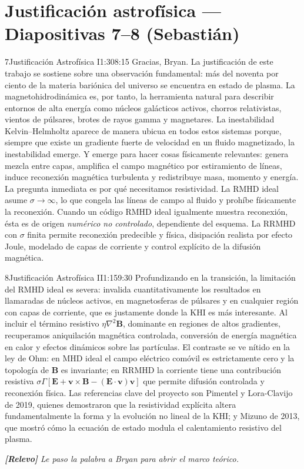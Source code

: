 \documentclass[11pt,a4paper]{article}
\newcommand{\relevo}[1]{%
  \par\medskip
  \noindent\colorbox{tagbg}{\parbox{\dimexpr\linewidth-2\fboxsep\relax}{%
    \small\itshape \textbf{[Relevo]} #1}}\par\medskip}
\begin{document}
\section{Justificación astrofísica --- Diapositivas 7--8 (Sebastián)}

\begin{seborador}{7}{Justificación Astrofísica I}{1:30}{8:15}
Gracias, Bryan. La justificación de este trabajo se sostiene sobre una
observación fundamental: más del noventa por ciento de la materia bariónica
del universo se encuentra en estado de plasma. La magnetohidrodinámica es,
por tanto, la herramienta natural para describir entornos de alta energía
como núcleos galácticos activos, chorros relativistas, vientos de púlsares,
brotes de rayos gamma y magnetares. La inestabilidad Kelvin--Helmholtz
aparece de manera ubicua en todos estos sistemas porque, siempre que existe
un gradiente fuerte de velocidad en un fluido magnetizado, la inestabilidad
emerge. Y emerge para hacer cosas físicamente relevantes: genera mezcla entre
capas, amplifica el campo magnético por estiramiento de líneas, induce
reconexión magnética turbulenta y redistribuye masa, momento y energía.
La pregunta inmediata es por qué necesitamos resistividad. La RMHD ideal
asume $\sigma\to\infty$, lo que congela las líneas de campo al fluido y
prohíbe físicamente la reconexión. Cuando un código RMHD ideal igualmente
muestra reconexión, ésta es de origen \emph{numérico no controlado},
dependiente del esquema. La RRMHD con $\sigma$ finita permite reconexión
predecible y física, disipación realista por efecto Joule, modelado de capas
de corriente y control explícito de la difusión magnética.
\end{seborador}

\begin{seborador}{8}{Justificación Astrofísica II}{1:15}{9:30}
Profundizando en la transición, la limitación del RMHD ideal es severa:
invalida cuantitativamente los resultados en llamaradas de núcleos activos,
en magnetosferas de púlsares y en cualquier región con capas de corriente,
que es justamente donde la KHI es más interesante. Al incluir el término
resistivo $\eta\nabla^2\mathbf{B}$, dominante en regiones de altos
gradientes, recuperamos aniquilación magnética controlada, conversión de
energía magnética en calor y efectos dinámicos sobre las partículas. El
contraste se ve nítido en la ley de Ohm: en MHD ideal el campo eléctrico
comóvil es estrictamente cero y la topología de $\mathbf{B}$ es invariante;
en RRMHD la corriente tiene una contribución resistiva
$\sigma\Gamma[\mathbf{E}+\mathbf{v}\times\mathbf{B}-(\mathbf{E}\cdot
\mathbf{v})\mathbf{v}]$ que permite difusión controlada y reconexión física.
Las referencias clave del proyecto son Pimentel y Lora-Clavijo de 2019,
quienes demostraron que la resistividad explícita altera fundamentalmente
la forma y la evolución no lineal de la KHI; y Mizuno de 2013, que mostró
cómo la ecuación de estado modula el calentamiento resistivo del plasma.
\relevo{Le paso la palabra a Bryan para abrir el marco teórico.}
\end{seborador}
\end{document}
